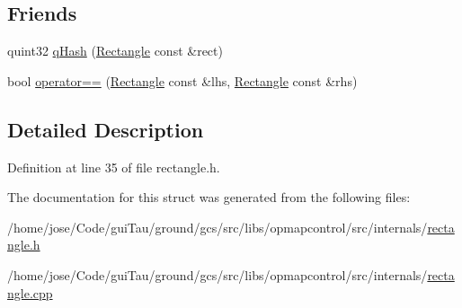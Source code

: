 \subsection*{Friends}
\begin{DoxyCompactItemize}
\item 
quint32 \hyperlink{group___o_p_map_widget_ga147a59b523f242e2fe2549b016688b2c}{q\-Hash} (\hyperlink{structinternals_1_1_rectangle}{Rectangle} const \&rect)
\item 
bool \hyperlink{group___o_p_map_widget_ga49a8cb6dd0aff741dcae36e54dedd8be}{operator==} (\hyperlink{structinternals_1_1_rectangle}{Rectangle} const \&lhs, \hyperlink{structinternals_1_1_rectangle}{Rectangle} const \&rhs)
\end{DoxyCompactItemize}


\subsection{Detailed Description}


Definition at line 35 of file rectangle.\-h.



The documentation for this struct was generated from the following files\-:\begin{DoxyCompactItemize}
\item 
/home/jose/\-Code/gui\-Tau/ground/gcs/src/libs/opmapcontrol/src/internals/\hyperlink{rectangle_8h}{rectangle.\-h}\item 
/home/jose/\-Code/gui\-Tau/ground/gcs/src/libs/opmapcontrol/src/internals/\hyperlink{rectangle_8cpp}{rectangle.\-cpp}\end{DoxyCompactItemize}
